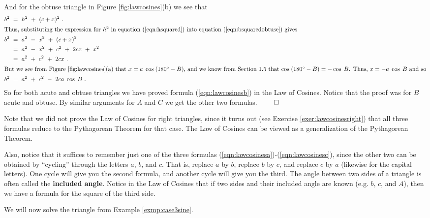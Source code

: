 And for the obtuse triangle in Figure \ref{fig:lawcosines}(b) we see that
\begin{align}
 b^2 ~&=~ h^2 ~+~ (c+x)^2 ~.\label{eqn:bsquaredobtuse}\\
 \intertext{Thus, substituting the expression for $h^2$ in equation (\ref{eqn:hsquared}) into
 equation (\ref{eqn:bsquaredobtuse}) gives}
 b^2 ~&=~ a^2 ~-~ x^2 ~+~ (c+x)^2\notag\\
  &=~ a^2 ~-~ x^2 ~+~ c^2 ~+~ 2cx ~+~ x^2\notag\\
  &=~ a^2 ~+~ c^2 ~+~ 2cx ~.\notag\\
 \intertext{But we see from Figure \ref{fig:lawcosines}(a) that $x = a\;\cos\;(180^\circ - B)$,
 and we know from Section 1.5 that $\cos\;(180^\circ - B) = -\cos\;B$. Thus, $x = -a\;\cos\;B$
 and so}
 b^2 ~&=~ a^2 ~+~ c^2 ~-~ 2ca\;\cos\;B ~.
\end{align}
So for both acute and obtuse triangles we have proved formula (\ref{eqn:lawcosinesb}) in the Law of
Cosines. Notice that the proof was for $B$ acute and obtuse. By similar arguments for $A$ and $C$
we get the other two formulas. $\qed$

Note that we did not prove the Law of Cosines for right triangles, since it turns out (see Exercise
\ref{exer:lawcosinesright}) that all three formulas reduce to the Pythagorean Theorem for that case.
The Law of Cosines can be viewed as a generalization of the Pythagorean Theorem.

Also, notice that it suffices to remember just one of the three formulas
(\ref{eqn:lawcosinesa})-(\ref{eqn:lawcosinesc}), since the other two can be obtained by ``cycling''
through the letters $a$, $b$, and $c$. That is, replace $a$ by $b$, replace $b$ by $c$, and replace
$c$ by $a$ (likewise for the capital letters). One cycle will give you the second formula, and
another cycle will give you the third.
\newpage
The angle between two sides of a triangle is often called the \textbf{included angle}. Notice in the Law of Cosines that if two sides and their included
angle are known (e.g. $b$, $c$, and $A$), then we have a formula for the square of the third side.

We will now solve the triangle from Example \ref{exmp:case3sine}.

